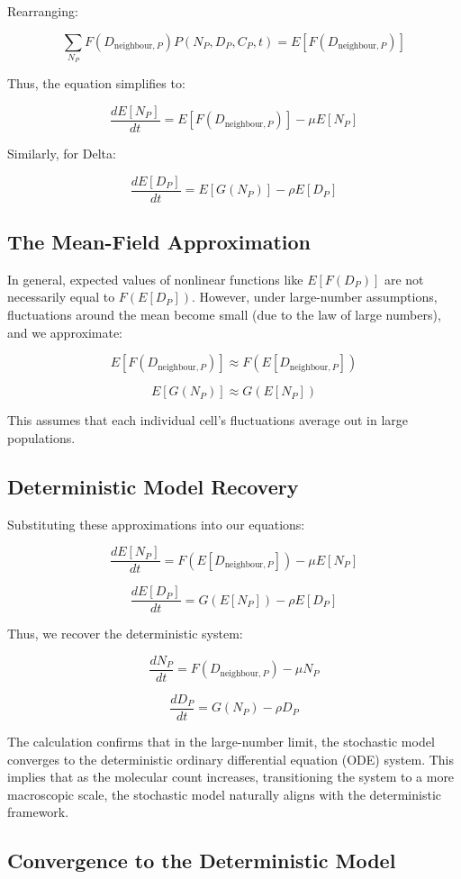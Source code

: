 \documentclass{article}
\begin{document}
Rearranging:

\[
\sum_{N_P} F(D_{\text{neighbour},P}) P(N_P, D_P, C_P, t) = E[F(D_{\text{neighbour},P})]
\]

Thus, the equation simplifies to:

\[
\frac{dE[N_P]}{dt} = E[F(D_{\text{neighbour},P})] - \mu E[N_P]
\]

Similarly, for Delta:

\[
\frac{dE[D_P]}{dt} = E[G(N_P)] - \rho E[D_P]
\]

\subsection{The Mean-Field Approximation}
In general, expected values of nonlinear functions like \( E[F(D_P)] \) are not necessarily equal to \( F(E[D_P]) \). However, under large-number assumptions, fluctuations around the mean become small (due to the law of large numbers), and we approximate:

\[
E[F(D_{\text{neighbour},P})] \approx F(E[D_{\text{neighbour},P}])
\]

\[
E[G(N_P)] \approx G(E[N_P])
\]

This assumes that each individual cell’s fluctuations average out in large populations.

\subsection{Deterministic Model Recovery}

Substituting these approximations into our equations:

\[
\frac{dE[N_P]}{dt} = F(E[D_{\text{neighbour},P}]) - \mu E[N_P]
\]

\[
\frac{dE[D_P]}{dt} = G(E[N_P]) - \rho E[D_P]
\]

Thus, we recover the deterministic system:

\[
\frac{dN_P}{dt} = F(D_{\text{neighbour},P}) - \mu N_P
\]

\[
\frac{dD_P}{dt} = G(N_P) - \rho D_P
\]

The calculation confirms that in the large-number limit, the stochastic model converges to the deterministic ordinary differential equation (ODE) system. This implies that as the molecular count increases, transitioning the system to a more macroscopic scale, the stochastic model naturally aligns with the deterministic framework.

\subsection{Convergence to the Deterministic Model}
\end{document}
